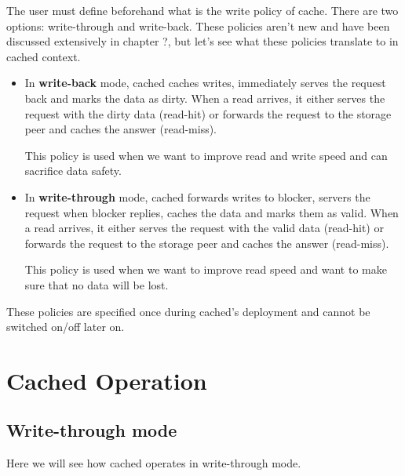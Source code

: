The user must define beforehand what is the write policy of cache. There are
two options: write-through and write-back. These policies aren't new and have 
been discussed extensively in chapter ?, but let's see what these policies 
translate to in cached context.

\begin{itemize}
	\item
		In \textbf{write-back} mode, cached caches writes, immediately 
		serves the request back and marks the data as dirty. When a read 
		arrives, it either serves the request with the dirty data 
		(read-hit) or forwards the request to the storage peer and 
		caches the answer (read-miss).

		This policy is used when we want to improve read and write speed 
		and can sacrifice data safety.
	\item
		In \textbf{write-through} mode, cached forwards writes to 
		blocker, servers the request when blocker replies, caches the 
		data and marks them as valid.  When a read arrives, it either 
		serves the request with the valid data (read-hit) or forwards 
		the request to the storage peer and caches the answer 
		(read-miss).

		This policy is used when we want to improve read speed and want 
		to make sure that no data will be lost.
\end{itemize}	

These policies are specified once during cached's deployment and cannot be 
switched on/off later on.

\section{Cached Operation}\label{sec:op-design}

\begin{comment}
Let's attempt to make the above a bit clearer. When cached receives a request, 
it first checks the request target (i.e. the object name and then calculates 
which bucket objects are within the request's range. It is easy to see that this 
is a 1:1 mapping to the object's data.
\end{comment}

\subsection{Write-through mode}

Here we will see how cached operates in write-through mode.

